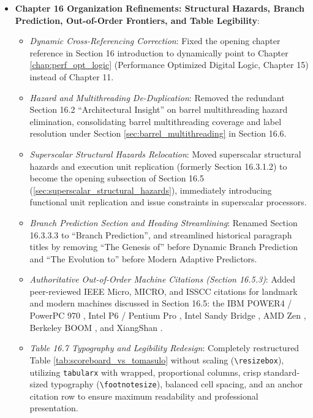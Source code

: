 \begin{itemize}
\begin{itemize}
        \item \textit{Analytical Exercises}: Formulated Problems 19.3, 19.5, and 19.6 with complete step-by-step mathematical solutions calculating no-forwarding stall penalties, ASAP7 silicon area and frequency trade-offs, CoreMark speedup decomposition under the 4-step pipeline delay model, and benchmark architectural requirements.
    \end{itemize}
    \item \textbf{Chapter 16 Organization Refinements: Structural Hazards, Branch Prediction, Out-of-Order Frontiers, and Table Legibility}:
    \begin{itemize}
        \item \textit{Dynamic Cross-Referencing Correction}: Fixed the opening chapter reference in Section 16 introduction to dynamically point to Chapter \ref{chap:perf_opt_logic} (Performance Optimized Digital Logic, Chapter 15) instead of Chapter 11.
        \item \textit{Hazard and Multithreading De-Duplication}: Removed the redundant Section 16.2 ``Architectural Insight'' on barrel multithreading hazard elimination, consolidating barrel multithreading coverage and label resolution under Section \ref{sec:barrel_multithreading} in Section 16.6.
        \item \textit{Superscalar Structural Hazards Relocation}: Moved superscalar structural hazards and execution unit replication (formerly Section 16.3.1.2) to become the opening subsection of Section 16.5 (\ref{sec:superscalar_structural_hazards}), immediately introducing functional unit replication and issue constraints in superscalar processors.
        \item \textit{Branch Prediction Section and Heading Streamlining}: Renamed Section 16.3.3.3 to ``Branch Prediction'', and streamlined historical paragraph titles by removing ``The Genesis of'' before Dynamic Branch Prediction and ``The Evolution to'' before Modern Adaptive Predictors.
        \item \textit{Authoritative Out-of-Order Machine Citations (Section 16.5.3)}: Added peer-reviewed IEEE Micro, MICRO, and ISSCC citations for landmark and modern machines discussed in Section 16.5: the IBM POWER4 / PowerPC 970 \cite{tendler2002power4}, Intel P6 / Pentium Pro \cite{papworth1996tuning}, Intel Sandy Bridge \cite{rotem2012power}, AMD Zen \cite{singh2017zen, suggs2020zen2}, Berkeley BOOM \cite{celio2018boom}, and XiangShan \cite{xiangshan2022micro}.
        \item \textit{Table 16.7 Typography and Legibility Redesign}: Completely restructured Table \ref{tab:scoreboard_vs_tomasulo} without scaling (\texttt{\textbackslash resizebox}), utilizing \texttt{tabularx} with wrapped, proportional columns, crisp standard-sized typography (\texttt{\textbackslash footnotesize}), balanced cell spacing, and an anchor citation row to ensure maximum readability and professional presentation.

\end{itemize}
\end{itemize}
